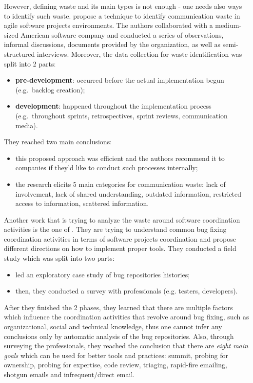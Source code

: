 \documentclass{mprop}
\begin{document}
However, defining waste and its main types is not enough - one needs also
ways to identify such waste. \citet{Korkala2014WasteIdentification} propose a
technique to identify communication waste in agile software projects 
environments. The authors collaborated with a medium-sized American software 
company and conducted a series of observations, informal discussions, documents 
provided by the organization, as well as semi-structured interviews. Moreover,
the data collection for waste identification was split into 2 parts:
  \begin{itemize}
    \item \textbf{pre-development}: occurred before the actual implementation
      begun (e.g.\ backlog creation);
    \item \textbf{development}: happened throughout the implementation
      process (e.g.\ throughout sprints, retrospectives, sprint reviews,
      communication media).
  \end{itemize}
They reached two main conclusions:
  \begin{itemize}
    \item this proposed approach was efficient and the authors recommend it to
      companies if they'd like to conduct such processes internally;
    \item the research elicits 5 main categories for communication waste: lack
      of involvement, lack of shared understanding, outdated information, 
      restricted access to information, scattered information.
  \end{itemize}

Another work that is trying to analyze the waste around software coordination activities
is the one of \citet{aranda2009secret}. They are trying to understand common bug fixing
coordination activities in terms of software projects coordination and propose different
directions on how to implement proper tools. They conducted a field study which was
split into two parts:
  \begin{itemize}
    \item led an exploratory case study of bug repositories histories;
    \item then, they conducted a survey with professionals (e.g. testers, developers).
  \end{itemize}
After they finished the 2 phases, they learned that there are multiple factors which
influence the coordination activities that revolve around bug fixing, such as organizational,
social and technical knowledge, thus one cannot infer any conclusions only by automatic analysis 
of the bug repositories. Also, through surveying the professionals, they reached the conclusion
that there are \emph{eight main goals} which can be used for better tools and practices: summit, 
probing for ownership, probing for expertise, code review, triaging, rapid-fire emailing, 
shotgun emails and infrequent/direct email.
\end{document}
